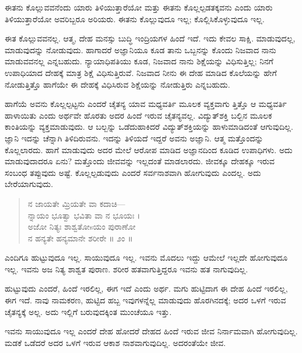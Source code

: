 {\small ಈತನು ಕೊಲ್ಲುವವನೆಂದು ಯಾರು ತಿಳಿಯುತ್ತಾರೆಯೋ ಮತ್ತು ಈತನು ಕೊಲ್ಲಲ್ಪಡತಕ್ಕವನು ಎಂದು ಯಾರು ತಿಳಿಯುತ್ತಾರೆಯೋ ಅವರಿಬ್ಬರೂ ಅರಿಯರು. 
 ಈತನು ಕೊಲ್ಲುವುದೂ ಇಲ್ಲ; ಕೊಲ್ಲಿಸಿಕೊಳ್ಳುವುದೂ ಇಲ್ಲ.}

ಈತ ಕೊಲ್ಲುವವನಲ್ಲ. ಆತ್ಮ, ದೇಹ ಮನಸ್ಸು ಬುದ್ಧಿ ಇಂದ್ರಿಯಗಳ ಹಿಂದೆ ಇದೆ. ಇದು ಕೇವಲ ಸಾಕ್ಷಿ. ಮಾಡುವುದಲ್ಲ, ಮಾಡುವುದನ್ನು ನೋಡುವುದು. ಹಾಗಾದರೆ ಅಜ್ಞಾನಿಯೂ ಕೂಡ ತಾನು ಒಬ್ಬನನ್ನು ಕೊಂದು ನಿಜವಾದ ನಾನು ಮಾಡುವವನಲ್ಲ ಎನ್ನಬಹುದು. ನ್ಯಾಯಾಧಿಪತಿಯು ಕೂಡ, ನಿಜವಾದ ನಾನು ಶಿಕ್ಷೆಯನ್ನು ವಿಧಿಸುತ್ತಿಲ್ಲ; ನಿನಗೆ ಉಪಾಧಿಯಾದ ದೇಹಕ್ಕೆ ಮಾತ್ರ ಶಿಕ್ಷೆ ವಿಧಿಸುತ್ತಿರುವೆ. ನಿಜವಾದ ನೀನು ಈ ದೇಹ ಮಾಡಿದ ಕೊಲೆಯನ್ನು ಹೇಗೆ ನೋಡುತ್ತಿತ್ತೊ ಹಾಗೆಯೇ ಈ ದೇಹಕ್ಕೆ ವಿಧಿಸಿರುವ ಶಿಕ್ಷೆಯನ್ನು ನೋಡುತ್ತಿರು ಎನ್ನಬಹುದು.

ಹಾಗೆಯೆ ಅವನು ಕೊಲ್ಲಲ್ಪಟ್ಟನು ಎಂದರೆ ಚೈತನ್ಯ ಯಾವ ಮಧ್ಯವರ್ತಿ ಮೂಲಕ ವ್ಯಕ್ತವಾಗು ತ್ತಿತ್ತೊ ಆ ಮಧ್ಯವರ್ತಿ ಹಾಳಾಯಿತು ಎಂದು ಅರ್ಥವೇ ಹೊರತು ಅದರ ಹಿಂದೆ ಇರುವ ಚೈತನ್ಯವಲ್ಲ. ವಿದ್ಯುತ್​ಶಕ್ತಿ ಬಲ್ಬಿನ ಮೂಲಕ ಕಾಂತಿಯನ್ನು ವ್ಯಕ್ತಮಾಡುವುದು. ಆ ಬಲ್ಬನ್ನು ಒಡೆದುಹಾಕಿದರೆ ವಿದ್ಯುತ್​ಶಕ್ತಿಯನ್ನು ಹಾಳುಮಾಡಿದಂತೆ ಆಗುವುದಿಲ್ಲ. ಜ್ಞಾನಿ ಇದನ್ನು ಚೆನ್ನಾಗಿ ತಿಳಿದಿರುವನು. ಇದನ್ನು ತಿಳಿಯದೆ ಇದ್ದರೆ ಅವನು ಅಜ್ಞಾನಿ. ಆತ್ಮ ಮತ್ತೊಂದನ್ನು ಕೊಲ್ಲಲಾರದು. ಹಾಗೆ ಮಾಡುವುದು ಅದರ ಮೇಲೆ ಆರೋಪ ಮಾಡಿದ ಅಜ್ಞಾನದಿಂದ ಕೂಡಿದ ಉಪಾಧಿಗಳು. ಅದು ಮಾಡುವುದಾದರೂ ಏನು? ಮತ್ತೊಂದು ಜೀವವನ್ನು ಇಲ್ಲದಂತೆ ಮಾಡಲಾರದು. ಜೀವಕ್ಕೂ ದೇಹಕ್ಕೂ ಇರುವ ಸಂಬಂಧ ತಪ್ಪುವುದು ಅಷ್ಟೆ. ಕೊಲ್ಲಲ್ಪಡುವುದು ಎಂದರೆ ಸರ್ವನಾಶವಾಗಿ ಹೋಗುವುದು ಎಂದಲ್ಲ. ಅದು ಬೇರೆಯಾಗುವುದು.

\begin{verse}
ನ ಜಾಯತೇ ಮ್ರಿಯತೇ ವಾ ಕದಾಚಿ—\\ನ್ನಾಯಂ ಭೂತ್ವಾ ಭವಿತಾ ವಾ ನ ಭೂಯಃ ।\\ಅಜೋ ನಿತ್ಯಃ ಶಾಶ್ವತೋsಯಂ ಪುರಾಣೋ\\ನ ಹನ್ಯತೇ ಹನ್ಯಮಾನೇ ಶರೀರೇ \num{॥ ೨ಂ ॥}
\end{verse}

{\small ಎಂದಿಗೂ ಹುಟ್ಟುವುದೂ ಇಲ್ಲ. ಸಾಯುವುದೂ ಇಲ್ಲ. ಇವನು ಮೊದಲು ಇದ್ದು ಆಮೇಲೆ ಇಲ್ಲದೇ ಹೋಗುವುದೂ ಇಲ್ಲ. ಇವನು ಅಜ ನಿತ್ಯ ಶಾಶ್ವತ ಪುರಾಣ. ಶರೀರ ಹತವಾಗುತ್ತಿದ್ದರೂ ಇವನು ಹತ ನಾಗುವುದಿಲ್ಲ.}

ಹುಟ್ಟುವುದು ಎಂದರೆ, ಹಿಂದೆ ಇರಲಿಲ್ಲ, ಈಗ ಇದೆ ಎಂದು ಅರ್ಥ. ಮಗು ಹುಟ್ಟಿದಾಗ ಈ ದೇಹ ಹಿಂದೆ ಇರಲಿಲ್ಲ, ಈಗ ಇದೆ. ನಾವು ನಾಮಕರಣ, ಹುಟ್ಟಿದ ಹಬ್ಬ ಇವುಗಳನ್ನೆಲ್ಲ ಮಾಡುವುದು ಹೊರಗಿನದಕ್ಕೆ; ಅದರ ಒಳಗೆ ಇರುವ ಚೈತನ್ಯಕ್ಕೆ ಅಲ್ಲ. ಅದು ಇಲ್ಲಿಗೆ ಬರುವುದಕ್ಕಿಂತ ಮುಂಚೆಯೂ ಇತ್ತು.

ಇವನು ಸಾಯುವುದೂ ಇಲ್ಲ ಎಂದರೆ ದೇಹ ಹೋದರೆ ದೇಹದ ಹಿಂದೆ ಇರುವ ಜೀವ ನಿರ್ನಾಮವಾಗಿ ಹೋಗುವುದಿಲ್ಲ. ಮಡಕೆ ಒಡೆದರೆ ಅದರ ಒಳಗೆ ಇರುವ ಆಕಾಶ ನಾಶವಾಗುವುದಿಲ್ಲ. ಅದರಂತೆಯೇ ಜೀವ.


